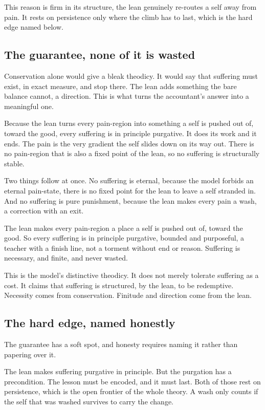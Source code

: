 This reason is firm in its structure, the lean genuinely re-routes a self away from pain. It rests on persistence only where the climb has to last, which is the hard edge named below.

\subsection{The guarantee, none of it is wasted}

Conservation alone would give a bleak theodicy. It would say that suffering must exist, in exact measure, and stop there. The lean adds something the bare balance cannot, a direction. This is what turns the accountant's answer into a meaningful one.

Because the lean turns every pain-region into something a self is pushed out of, toward the good, every suffering is in principle purgative. It does its work and it ends. The pain is the very gradient the self slides down on its way out. There is no pain-region that is also a fixed point of the lean, so no suffering is structurally stable.

Two things follow at once. No suffering is eternal, because the model forbids an eternal pain-state, there is no fixed point for the lean to leave a self stranded in. And no suffering is pure punishment, because the lean makes every pain a wash, a correction with an exit.

\begin{result}
The lean makes every pain-region a place a self is pushed out of, toward the good. So every suffering is in principle purgative, bounded and purposeful, a teacher with a finish line, not a torment without end or reason. Suffering is necessary, and finite, and never wasted.
\end{result}

This is the model's distinctive theodicy. It does not merely tolerate suffering as a cost. It claims that suffering is structured, by the lean, to be redemptive. Necessity comes from conservation. Finitude and direction come from the lean.

\subsection{The hard edge, named honestly}

The guarantee has a soft spot, and honesty requires naming it rather than papering over it.

The lean makes suffering purgative in principle. But the purgation has a precondition. The lesson must be encoded, and it must last. Both of those rest on persistence, which is the open frontier of the whole theory. A wash only counts if the self that was washed survives to carry the change.

